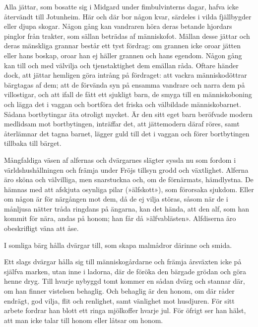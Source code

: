 Alla jättar, som bosatte sig i Midgard under fimbulvinterns dagar, hafva
icke återvändt till Jotunheim. Här och där bor någon kvar, särdeles i
vilda fjällbygder eller djupa skogar. Någon gång kan vandraren höra
deras betande hjordars pinglor från trakter, som sällan beträdas af
människofot. Mällan desse jättar och deras mänskliga grannar består ett
tyst fördrag: om grannen icke oroar jätten eller hans boskap, oroar han
ej häller grannen och hans egendom. Någon gång kan till och med välvilja
och tjenstaktighet dem emällan råda. Oftare
\protect\hypertarget{lb1625905.xhtmlux5cux23start177}{}{}\protect\hypertarget{lb1625905.xhtmlux5cux23start177-a}{}{}\protect\hypertarget{lb1625905.xhtmlux5cux23start177-b}{}{}\protect\hypertarget{lb1625905.xhtmlux5cux23start177-c}{}{}\protect\hypertarget{lb1625905.xhtmlux5cux23start177-d}{}{}
händer dock, att jättar hemligen göra intrång på fördraget: att vackra
människodöttrar bärgtagas af dem; att de förvända syn på ensamma
vandrare och narra dem på villostigar, och att ifall de fått ett
sjukligt barn, de smyga till en människoboning och lägga det i vaggan
och bortföra det friska och välbildade människobarnet. Sådana
bortbytingar äta otroligt mycket. Är den sitt eget barn beröfvade modern
medlidsam mot bortbytingen, inträffar det, att jättemodern däraf röres,
samt återlämnar det tagna barnet, lägger guld till det i vaggan och
förer bortbytingen tillbaka till bärget.

Mångfaldiga väsen af alfernas och dvärgarnes slägter syssla nu som
fordom i världshushållningen och främja under Fröjs tillsyn grodd och
växtlighet. Alferna äro sköna och välvilliga, men snarstuckna och, om de
förnärmats, hämdlystna. De hämnas med att afskjuta osynliga pilar
(»älfskott»), som förorsaka sjukdom. Eller om någon är för närgången mot
dem, då de ej vilja störas, såsom när de i månljusa nätter tråda
ringdans på ängarna, kan det hända, att den alf, som han kommit för
nära, andas på honom; han får då »älfvablästen». Alfdiserna äro
obeskrifligt väna att åse.

I somliga bärg hålla dvärgar till, som skapa malmådror därinne och
smida.

Ett slags dvärgar hålla sig till människogårdarne och främja årsväxten
icke på själfva marken, utan inne i ladorna, där de föröka den bärgade
grödan och göra henne dryg. Till hvarje nybyggd tomt kommer en sådan
dvärg och stannar där, om han finner vistelsen behaglig. Och behaglig är
den honom, om där råder endrägt, god vilja, flit och renlighet, samt
vänlighet mot husdjuren. För sitt arbete fordrar han blott ett ringa
mjölkoffer hvarje jul. För öfrigt ser han hälst, att man icke talar till
honom eller låtsar om honom.

